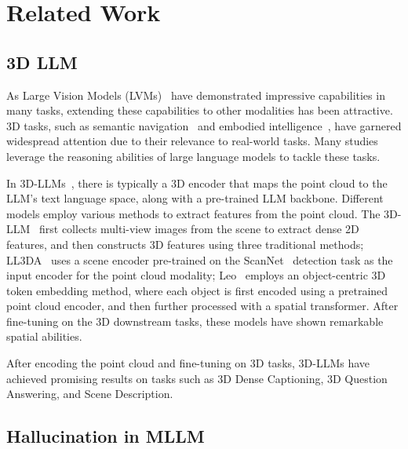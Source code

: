 \section{Related Work}
\label{sec::related}
\subsection{3D LLM}

As Large Vision Models (LVMs)~\cite{shen2024aligning, zhang2022dino, kirillov2023segment, oquab2023dinov2} have demonstrated impressive capabilities in many tasks, extending these capabilities to other modalities has been attractive. 3D tasks, such as semantic navigation~\cite{zheng2024towards, huang2023embodied} and embodied intelligence~\cite{jatavallabhula2023conceptfusion, hong2024multiply}, have garnered widespread attention due to their relevance to real-world tasks. Many studies leverage the reasoning abilities of large language models to tackle these tasks.

In 3D-LLMs~\cite{hong20233d-3dllm}, there is typically a 3D encoder that maps the point cloud to the LLM's text language space, along with a pre-trained LLM backbone. Different models employ various methods to extract features from the point cloud.
The 3D-LLM~\cite{hong20233d-3dllm} first collects multi-view images from the scene to extract dense 2D features, and then constructs 3D features using three traditional methods; LL3DA~\cite{chen2024ll3da} uses a scene encoder pre-trained on the ScanNet~\cite{dai2017scannet} detection task as the input encoder for the point cloud modality; Leo~\cite{huang2023embodied} employs an object-centric 3D token embedding method, where each object is first encoded using a pretrained point cloud encoder, and then further processed with a spatial transformer. After fine-tuning on the 3D downstream tasks, these models have shown remarkable spatial abilities.

After encoding the point cloud and fine-tuning on 3D tasks, 3D-LLMs have achieved promising results on tasks such as 3D Dense Captioning, 3D Question Answering, and Scene Description.

\subsection{Hallucination in MLLM}

